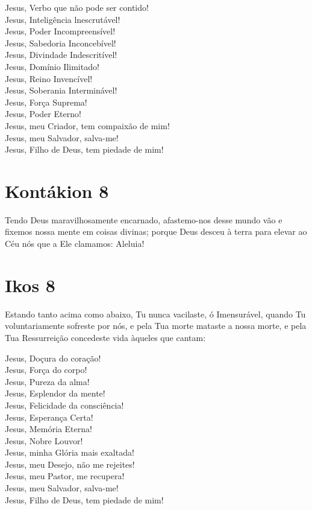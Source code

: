 \documentclass{subfiles}
\begin{document}
Jesus, Verbo que não pode ser contido! \\
Jesus, Inteligência lnescrutável! \\
Jesus, Poder Incompreensível! \\
Jesus, Sabedoria Inconcebível! \\
Jesus, Divindade Indescritível! \\
Jesus, Domínio Ilimitado! \\
Jesus, Reino Invencível! \\
Jesus, Soberania Interminável! \\
Jesus, Força Suprema! \\
Jesus, Poder Eterno! \\
Jesus, meu Criador, tem compaixão de mim! \\
Jesus, meu Salvador, salva-me! \\
Jesus, Filho de Deus, tem piedade de mim!

\section{Kontákion 8}

Tendo Deus maravilhosamente encarnado, afastemo-nos desse
mundo vão e fixemos nossa mente em coisas divinas; porque Deus desceu à
terra para elevar ao Céu nós que a Ele clamamos: Aleluia!

\section{Ikos 8}

Estando tanto acima como abaixo, Tu nunca vacilaste, ó Imensurável,
quando Tu voluntariamente sofreste por nós, e pela Tua morte mataste a
nossa morte, e pela Tua Ressurreição concedeste vida àqueles que cantam:

Jesus, Doçura do coração! \\
Jesus, Força do corpo! \\
Jesus, Pureza da alma! \\
Jesus, Esplendor da mente! \\
Jesus, Felicidade da consciência! \\
Jesus, Esperança Certa! \\
Jesus, Memória Eterna! \\
Jesus, Nobre Louvor! \\
Jesus, minha Glória mais exaltada! \\
Jesus, meu Desejo, não me rejeites! \\
Jesus, meu Pastor, me recupera! \\
Jesus, meu Salvador, salva-me! \\
Jesus, Filho de Deus, tem piedade de mim!
\end{document}
